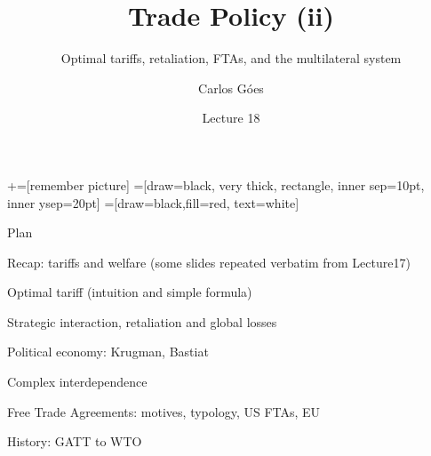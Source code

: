 \documentclass[notes,11pt, aspectratio=169, xcolor=table]{beamer}
\title[]{Trade Policy (ii)}
\subtitle[]{Optimal tariffs, retaliation, FTAs, and the multilateral system}
\author[Góes]
{Carlos Góes\inst{1}}
\date{Lecture 18}
\institute[GWU]{\inst{1} George Washington University }
\newenvironment{wideitemize}{\itemize\addtolength{\itemsep}{10pt}}{\enditemize}
\begin{document}
\newcommand\marktopleft[1]{%
    \tikz[overlay,remember picture] 
        \node (marker-#1-a) at (-.3em,.3em) {};%
}\newcommand\markbottomright[2]{%
    \tikz[overlay,remember picture] 
        \node (marker-#1-b) at (0em,0em) {};%
}
+=[remember picture] 
 =[draw=black, very thick, rectangle, inner sep=10pt, inner ysep=20pt]
 =[draw=black,fill=red, text=white]


\frame{\titlepage}
\addtocounter{framenumber}{-1}

\begin{frame}{Plan}
\begin{wideitemize}
    \item Recap: tariffs and welfare (some slides repeated verbatim from Lecture17)
    \item Optimal tariff (intuition and simple formula)
    \item Strategic interaction, retaliation and global losses
    \item Political economy: Krugman, Bastiat
    \item Complex interdependence
    \item Free Trade Agreements: motives, typology, US FTAs, EU
    \item History: GATT to WTO
\end{wideitemize}
\end{frame}

\end{document}
